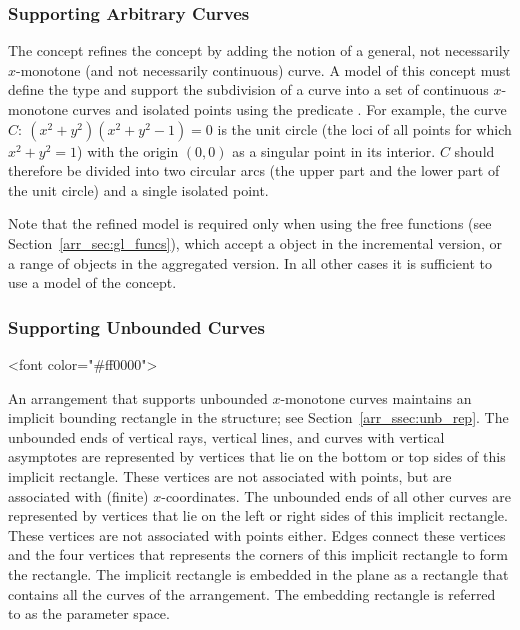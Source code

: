 \subsubsection{Supporting Arbitrary Curves
\label{arr_sssec:tr_full_concept}}

The concept  refines the
 concept by adding the notion
of a general, not necessarily $x$-monotone (and not necessarily
continuous) curve. A model of this concept must define the
 type and support the subdivision of a curve into a
set of continuous $x$-monotone curves and isolated points using
the predicate . For example, the curve
$C:\ (x^2 + y^2)(x^2 + y^2 - 1) = 0$ is the unit circle (the loci
of all points for which $x^2 + y^2  = 1$) with the origin $(0,0)$
as a singular point in its interior. $C$ should therefore be
divided into two circular arcs (the upper part and the lower part
of the unit circle) and a single isolated point.

Note that the refined model  is required
only when using the free  functions (see
Section~\ref{arr_sec:gl_funcs}), which accept a  object
in the incremental version, or a range of  objects in the
aggregated version. In all other cases it is sufficient to use a model
of the  concept.

\subsubsection{Supporting Unbounded Curves}
%
\lcTex{\color{red}}
\begin{ccHtmlOnly}
<font color="#ff0000">
\end{ccHtmlOnly}
An arrangement that supports unbounded $x$-monotone curves maintains
an implicit bounding rectangle in the \dcel{} structure; see
Section~\ref{arr_ssec:unb_rep}. The unbounded ends of vertical rays, 
vertical lines, and curves with vertical asymptotes are represented
by vertices that lie on the bottom or top sides of this implicit
rectangle. These vertices are not associated with points, but are
associated with (finite) $x$-coordinates. The unbounded ends of all
other curves are represented by vertices that lie on the left or
right sides of this implicit rectangle. These vertices are not
associated with points either. Edges connect these vertices and the
four vertices that represents the corners of this implicit rectangle
to form the rectangle. The implicit rectangle is embedded in the
plane as a rectangle that contains all the curves of the arrangement.
The embedding rectangle is referred to as the parameter space. 

